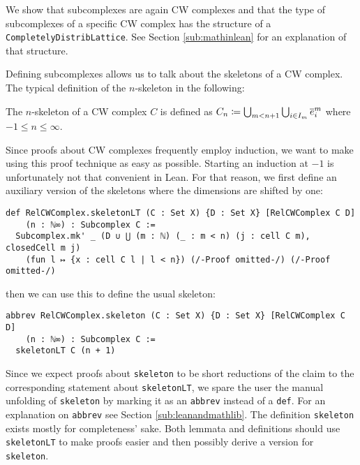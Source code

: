 We show that subcomplexes are again CW complexes and that the type of subcomplexes of a specific CW complex has the structure of a \lstinline|CompletelyDistribLattice|. 
See Section \ref{sub:mathinlean} for an explanation of that structure.  

Defining subcomplexes allows us to talk about the skeletons of a CW complex. 
The typical definition of the $n$-skeleton in the following: 

\begin{defi}
  The $n$-skeleton of a CW complex $C$ is defined as $C_n \coloneq \bigcup_{m < n + 1} \bigcup_{i \in I_m} \closedCell{m}{i}$ where $-1 \le n \le \infty$.
\end{defi}

Since proofs about CW complexes frequently employ induction, we want to make using this proof technique as easy as possible. 
Starting an induction at $-1$ is unfortunately not that convenient in Lean. 
For that reason, we first define an auxiliary version of the skeletons where the dimensions are shifted by one: 

\begin{lstlisting}[frame=single]
def RelCWComplex.skeletonLT (C : Set X) {D : Set X} [RelCWComplex C D] 
    (n : ℕ∞) : Subcomplex C :=
  Subcomplex.mk' _ (D ∪ ⋃ (m : ℕ) (_ : m < n) (j : cell C m), closedCell m j)
    (fun l ↦ {x : cell C l | l < n}) (/-Proof omitted-/) (/-Proof omitted-/)
\end{lstlisting}

then we can use this to define the usual skeleton: 

\begin{lstlisting}[frame=single]
abbrev RelCWComplex.skeleton (C : Set X) {D : Set X} [RelCWComplex C D] 
    (n : ℕ∞) : Subcomplex C :=
  skeletonLT C (n + 1)
\end{lstlisting}

Since we expect proofs about \lstinline|skeleton| to be short reductions of the claim to the corresponding statement about \lstinline|skeletonLT|, we spare the user the manual unfolding of \lstinline|skeleton| by marking it as an \lstinline|abbrev| instead of a \lstinline|def|.
For an explanation on \lstinline|abbrev| see Section \ref{sub:leanandmathlib}.
The definition \lstinline|skeleton| exists mostly for completeness' sake. 
Both lemmata and definitions should use \lstinline|skeletonLT| to make proofs easier and then possibly derive a version for \lstinline|skeleton|.


